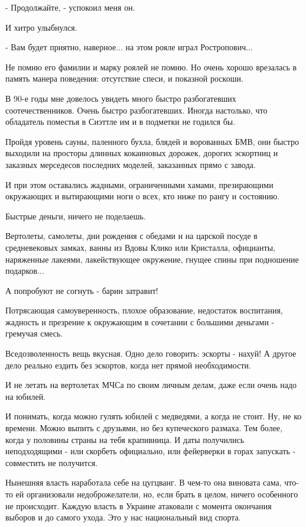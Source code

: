 - Продолжайте, - успокоил меня он. 

И хитро улыбнулся.

- Вам будет приятно, наверное... на этом рояле играл Ростропович...

Не помню его фамилии и марку роялей не помню. Но очень хорошо врезалась в
память манера поведения: отсутствие спеси, и показной роскоши.

В 90-е годы мне довелось увидеть много быстро разбогатевших соотечественников.
Очень быстро разбогатевших. Иногда настолько, что обладатель поместья в Сиэттле
им и в подметки не годился бы.

Пройдя уровень сауны, паленного бухла, блядей и ворованных БМВ, они быстро
выходили на просторы длинных кокаиновых дорожек, дорогих эскортниц и заказных
мерседесов последних моделей, заказанных прямо с завода.

И при этом оставались жадными, ограниченными хамами, презирающими окружающих и
вытирающими ноги о всех, кто ниже по рангу и состоянию.

Быстрые деньги, ничего не поделаешь.

Вертолеты, самолеты, дни рождения с обедами и на царской посуде в средневековых
замках, ванны из Вдовы Клико или Кристалла, официанты, наряженные лакеями,
лакействующее окружение, гнущее спины при подношение подарков...

А попробуют не согнуть - барин затравит!

Потрясающая самоуверенность, плохое образование, недостаток воспитания,
жадность и презрение к окружающим в сочетании с большими деньгами - гремучая
смесь.

Вседозволенность вещь вкусная. Одно дело говорить: эскорты - нахуй! А другое
дело реально ездить без эскортов, когда нет прямой необходимости. 

И не летать на вертолетах МЧСа по своим личным делам, даже если очень надо на
юбилей.

И понимать, когда можно гулять юбилей с медведями, а когда не стоит. Ну, не ко
времени. Можно выпить с друзьями, но без купеческого размаха. Тем более, когда
у половины страны на тебя крапивница. И даты получились неподходящими - или
скорбеть официально, или фейерверки в горах запускать - совместить не
получится.

Нынешняя власть наработала себе на цугцванг. В чем-то она виновата сама, что-то
ей организовали недоброжелатели, но, если брать в целом, ничего особенного не
происходит. Каждую власть в Украине атаковали с момента окончания выборов и до
самого ухода. Это у нас национальный вид спорта.

